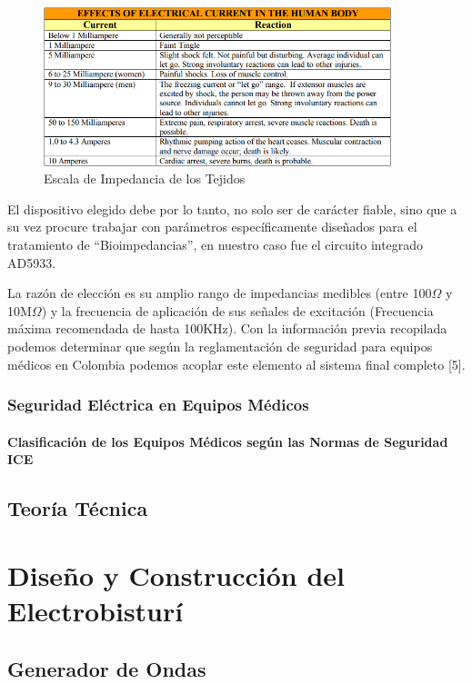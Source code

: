 \documentclass[12pt,letterpaper,spanish]{article}
\begin{document}
				\begin{figure}[H]
					\centering
					\includegraphics[width=0.9\textwidth]{./Imagenes/Current_Ef.png}
					\caption{Escala de Impedancia de los Tejidos}
				\end{figure}			
			
				El dispositivo elegido debe por lo tanto, no solo ser de carácter fiable, sino que a su vez procure trabajar con parámetros específicamente diseñados para el tratamiento de “Bioimpedancias”, en nuestro caso fue el circuito integrado AD5933.
			
				La razón de elección es su amplio rango de impedancias medibles (entre 100$\Omega$ y 10M$\Omega$) y la frecuencia de aplicación de sus señales de excitación (Frecuencia máxima recomendada de hasta 100KHz). Con la información previa recopilada podemos determinar que según la reglamentación de seguridad para equipos médicos en Colombia podemos acoplar este elemento al sistema final completo [5].
		
			\subsubsection{Seguridad Eléctrica en Equipos Médicos}	
				\paragraph{Clasificación de los Equipos Médicos según las Normas de Seguridad ICE}	
		
		\subsection{Teoría Técnica}
		
	\section{Diseño y Construcción del Electrobisturí}
		\subsection{Generador de Ondas}
		
\end{document}
